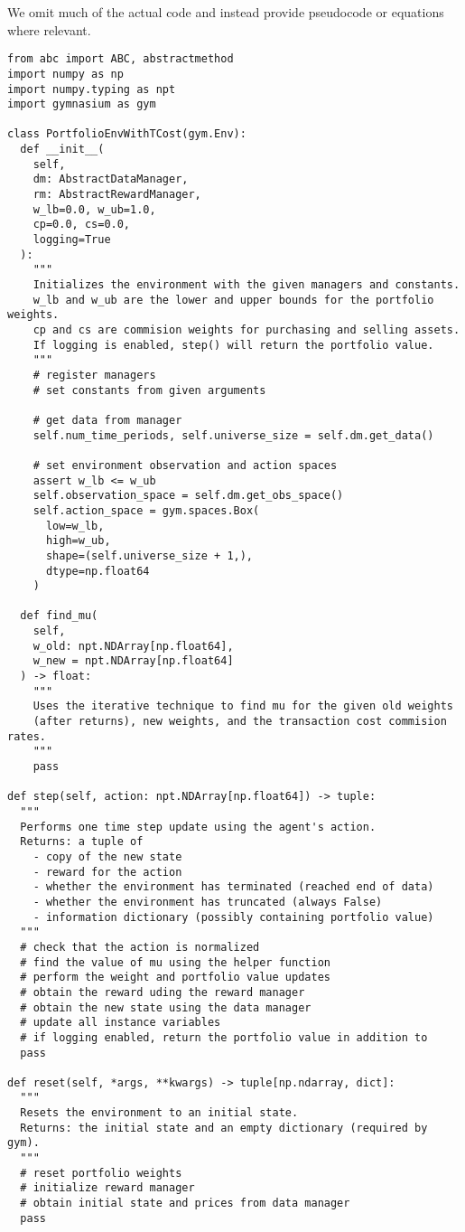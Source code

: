 We omit much of the actual code and instead provide pseudocode or equations where relevant.

\begin{verbatim}
from abc import ABC, abstractmethod
import numpy as np
import numpy.typing as npt
import gymnasium as gym

class PortfolioEnvWithTCost(gym.Env):
  def __init__(
    self,
    dm: AbstractDataManager,
    rm: AbstractRewardManager,
    w_lb=0.0, w_ub=1.0,
    cp=0.0, cs=0.0,
    logging=True
  ):
    """
    Initializes the environment with the given managers and constants.
    w_lb and w_ub are the lower and upper bounds for the portfolio weights.
    cp and cs are commision weights for purchasing and selling assets.
    If logging is enabled, step() will return the portfolio value.
    """
    # register managers
    # set constants from given arguments

    # get data from manager
    self.num_time_periods, self.universe_size = self.dm.get_data()

    # set environment observation and action spaces
    assert w_lb <= w_ub
    self.observation_space = self.dm.get_obs_space()
    self.action_space = gym.spaces.Box(
      low=w_lb,
      high=w_ub,
      shape=(self.universe_size + 1,),
      dtype=np.float64
    )

  def find_mu(
    self,
    w_old: npt.NDArray[np.float64],
    w_new = npt.NDArray[np.float64]
  ) -> float:
    """
    Uses the iterative technique to find mu for the given old weights
    (after returns), new weights, and the transaction cost commision rates.
    """
    pass

def step(self, action: npt.NDArray[np.float64]) -> tuple:
  """
  Performs one time step update using the agent's action.
  Returns: a tuple of
    - copy of the new state
    - reward for the action
    - whether the environment has terminated (reached end of data)
    - whether the environment has truncated (always False)
    - information dictionary (possibly containing portfolio value)
  """
  # check that the action is normalized
  # find the value of mu using the helper function
  # perform the weight and portfolio value updates
  # obtain the reward uding the reward manager
  # obtain the new state using the data manager
  # update all instance variables
  # if logging enabled, return the portfolio value in addition to
  pass

def reset(self, *args, **kwargs) -> tuple[np.ndarray, dict]:
  """
  Resets the environment to an initial state.
  Returns: the initial state and an empty dictionary (required by gym).
  """
  # reset portfolio weights
  # initialize reward manager
  # obtain initial state and prices from data manager
  pass
\end{verbatim}

